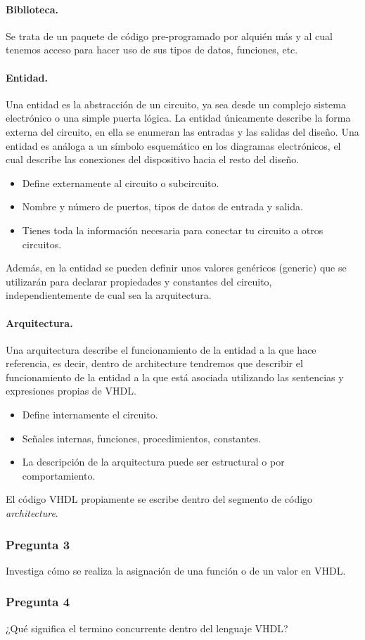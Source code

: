 \documentclass[../procedimientos.tex]{subfiles}
\begin{document}
\paragraph{Biblioteca.} Se trata de un paquete de código pre-programado por 
alquién más y al cual tenemos acceso para hacer uso de sus tipos de datos, 
funciones, etc.

\paragraph{Entidad.} Una entidad es la abstracción de un circuito, ya sea 
desde un complejo sistema electrónico o una simple puerta lógica. La 
entidad únicamente describe la forma externa del circuito, en ella se 
enumeran las entradas y las salidas del diseño. Una entidad es análoga a 
un símbolo esquemático en los diagramas electrónicos, el cual describe las 
conexiones del  dispositivo hacia el resto del diseño.
\begin{itemize}
  \item Define externamente al circuito o subcircuito.
  \item Nombre y número de puertos, tipos de datos de entrada y salida.
  \item Tienes toda la información necesaria para conectar tu circuito a 
    otros circuitos.
\end{itemize}
Además, en la entidad se pueden definir unos valores genéricos (generic) que 
se utilizarán para declarar propiedades y constantes del circuito, 
independientemente de cual sea la arquitectura.

\paragraph{Arquitectura.} Una arquitectura describe el funcionamiento de la 
entidad a la que hace referencia, es decir, dentro de architecture tendremos 
que describir el funcionamiento de la entidad a la que está asociada 
utilizando las sentencias y expresiones propias de VHDL.
\begin{itemize}
  \item Define internamente el circuito.
  \item Señales internas, funciones, procedimientos, constantes.
  \item La descripción de la arquitectura puede ser estructural o por 
    comportamiento.
\end{itemize}
El código VHDL propiamente se escribe dentro del segmento de código 
\textit{architecture}.

\subsubsection*{Pregunta 3}
\begin{em}
  Investiga cómo se realiza la asignación de una función o de un valor en 
  VHDL.
\end{em}

\subsubsection*{Pregunta 4}
\begin{em}
  ¿Qué significa el termino concurrente dentro del lenguaje VHDL?
\end{em}
\end{document}
